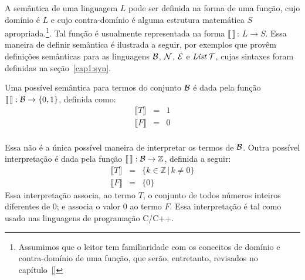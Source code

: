A sem\^antica de uma linguagem $L$ pode ser definida na forma de uma função, cujo domínio é $L$ e cujo contra-domínio é alguma estrutura matemática $S$ apropriada.\footnote{Assumimos que o leitor tem familiaridade com os conceitos de dom\'inio e contra-dom\'inio de uma função, que serão, entretanto, revisados no cap\'itulo~\ref{}}.  Tal função é usualmente representada na forma $\llbracket\,\rrbracket\,:\,L \rightarrow S$. Essa maneira de definir semântica é ilustrada a seguir, por exemplos que provêm definições semânticas para as linguagens $\mathcal{B}$, $\mathcal{N}$, $\mathcal{E}$ e $\textit{List\/}\,\mathcal{T}$, cujas sintaxes foram definidas na se\c{c}\~ao~\ref{cap1:syn}.

\begin{Definition}
Uma poss\'ivel sem\^antica para termos do conjunto $\mathcal{B}$ \'e dada pela fun\c{c}\~ao $\llbracket\,\rrbracket : \mathcal{B} \rightarrow \{0,1\}$, definida como:
\[
\begin{array}{lcl}
\llbracket T \rrbracket & = & 1\\
\llbracket F \rrbracket & = & 0\\
\end{array}
\]
\end{Definition}
Essa não é a \'unica poss\'ivel maneira de interpretar os termos de $\mathcal{B}$.
Outra poss\'ivel interpretação é dada pela função $\llbracket\,\rrbracket : \mathcal{B} \rightarrow \mathbb{Z}$, definida a seguir:
\[
\begin{array}{lcl}
\llbracket T \rrbracket & = & \{k\in\mathbb{Z}\,|\,k\neq 0\}\\
\llbracket F \rrbracket & = & \{0\}
\end{array}
\]
Essa interpretação associa, ao termo $T$, o conjunto de todos números inteiros diferentes de $0$; e associa o valor $0$ ao termo $F$. Essa interpretação é tal como usado nas linguagens de programa\c{c}\~ao C/C++.


